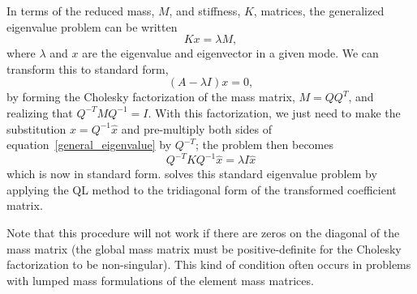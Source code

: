 In terms of the reduced mass, $M$, and stiffness, $K$, matrices, the 
generalized eigenvalue problem can be written
\begin{equation}
\label{general_eigenvalue}
K x = \lambda M,
\end{equation}
where $\lambda$ and $x$ are the eigenvalue and eigenvector in a given mode.
We can transform this to standard form, 
\begin{equation}
\left( A - \lambda I \right) x = 0,
\end{equation}
by forming the Cholesky factorization of the mass matrix, $M = QQ^{T}$,
and realizing that $Q^{-T} M Q^{-1} = I$.  With this factorization, we just 
need to make the substitution $x = Q^{-1} {\hat x}$ and pre-multiply both sides
of equation~\ref{general_eigenvalue} by $Q^{-T}$; the problem then becomes
\begin{equation}
Q^{-T} K Q^{-1} {\hat x} = \lambda I {\hat x}
\end{equation}
which is now in standard form.  \felt{} solves this standard eigenvalue problem
by applying the QL method to the tridiagonal form of the transformed 
coefficient matrix.

Note that this procedure will not work if there are zeros on the diagonal
of the mass matrix (the global mass matrix must be positive-definite for the
Cholesky factorization to be non-singular).  This kind of condition often 
occurs in problems with lumped mass formulations of the element mass matrices.  
